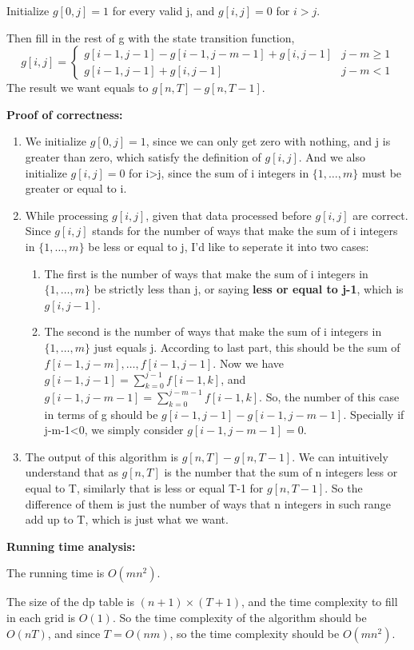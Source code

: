 \documentclass{article}
\begin{document}
Initialize $g[0,j]=1$ for every valid j, and $g[i,j]=0$ for $i>j$.

Then fill in the rest of g with the state transition function, $$g[i,j]=\begin{cases}
		g[i-1,j-1]-g[i-1,j-m-1]+g[i,j-1] & j-m\geq 1 \\
		g[i-1,j-1]+g[i,j-1]              & j-m<1
	\end{cases}$$
The result we want equals to $g[n,T]-g[n,T-1]$.

\textbf{Proof of correctness:}

\begin{enumerate}
	\item We initialize $g[0,j]=1$, since we can only get zero with nothing, and j is greater than zero, which satisfy the definition of $g[i,j]$. And we also initialize $g[i,j]=0$ for i>j, since the sum of i integers in $\{1,\dots,m\}$ must be greater or equal to i.
	\item While processing $g[i, j]$, given that data processed before $g[i, j]$ are correct. Since $g[i,j]$ stands for the number of ways that make the sum of i integers in $\{1,\dots,m\}$ be less or equal to j, I'd like to seperate it into two cases:
	      \begin{enumerate}
		      \item The first is the number of ways that make the sum of i integers in $\{1,\dots,m\}$ be strictly less than j, or saying \textbf{less or equal to j-1}, which is $g[i,j-1]$.
		      \item The second is the number of ways that make the sum of i integers in $\{1,\dots,m\}$ just equals j. According to last part, this should be the sum of $f[i-1,j-m],\dots,f[i-1,j-1]$. Now we have $g[i-1,j-1]=\sum_{k=0}^{j-1}f[i-1,k]$, and $g[i-1,j-m-1]=\sum_{k=0}^{j-m-1}f[i-1,k].$ So, the number of this case in terms of g should be $g[i-1,j-1]-g[i-1,j-m-1]$. Specially if j-m-1<0, we simply consider $g[i-1,j-m-1]=0$.
	      \end{enumerate}
	\item The output of this algorithm is $g[n,T]-g[n,T-1]$. We can intuitively understand that as $g[n,T]$ is the number that the sum of n integers less or equal to T, similarly that is less or equal T-1 for $g[n,T-1]$. So the difference of them is just the number of ways that n integers in such range add up to T, which is just what we want.
\end{enumerate}

\textbf{Running time analysis:}

The running time is $O(mn^2)$.

The size of the dp table is $(n+1)\times (T+1)$, and the time complexity to fill in each grid is $O(1)$.
So the time complexity of the algorithm should be $O(nT)$, and since $T=O(nm)$, so the time complexity should be $O(mn^2)$.
\end{document}
